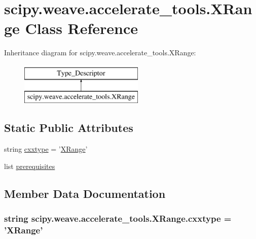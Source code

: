 \hypertarget{classscipy_1_1weave_1_1accelerate__tools_1_1XRange}{}\section{scipy.\+weave.\+accelerate\+\_\+tools.\+X\+Range Class Reference}
\label{classscipy_1_1weave_1_1accelerate__tools_1_1XRange}
Inheritance diagram for scipy.\+weave.\+accelerate\+\_\+tools.\+X\+Range\+:\begin{figure}[H]
\begin{center}
\leavevmode
\includegraphics[height=2.000000cm]{classscipy_1_1weave_1_1accelerate__tools_1_1XRange}
\end{center}
\end{figure}
\subsection*{Static Public Attributes}
\begin{DoxyCompactItemize}
\item 
string \hyperlink{classscipy_1_1weave_1_1accelerate__tools_1_1XRange_a68649f5d12fd3f2b2a18c5241bcf8c32}{cxxtype} = '\hyperlink{classscipy_1_1weave_1_1accelerate__tools_1_1XRange}{X\+Range}'
\item 
list \hyperlink{classscipy_1_1weave_1_1accelerate__tools_1_1XRange_ac17e5025f922d4e4e07eac7907a4bdd1}{prerequisites}
\end{DoxyCompactItemize}


\subsection{Member Data Documentation}
\hypertarget{classscipy_1_1weave_1_1accelerate__tools_1_1XRange_a68649f5d12fd3f2b2a18c5241bcf8c32}{}
\subsubsection[{cxxtype}]{\setlength{\rightskip}{0pt plus 5cm}string scipy.\+weave.\+accelerate\+\_\+tools.\+X\+Range.\+cxxtype = '{\bf X\+Range}'\hspace{0.3cm}{\ttfamily [static]}}\label{classscipy_1_1weave_1_1accelerate__tools_1_1XRange_a68649f5d12fd3f2b2a18c5241bcf8c32}
\hypertarget{classscipy_1_1weave_1_1accelerate__tools_1_1XRange_ac17e5025f922d4e4e07eac7907a4bdd1}{}
